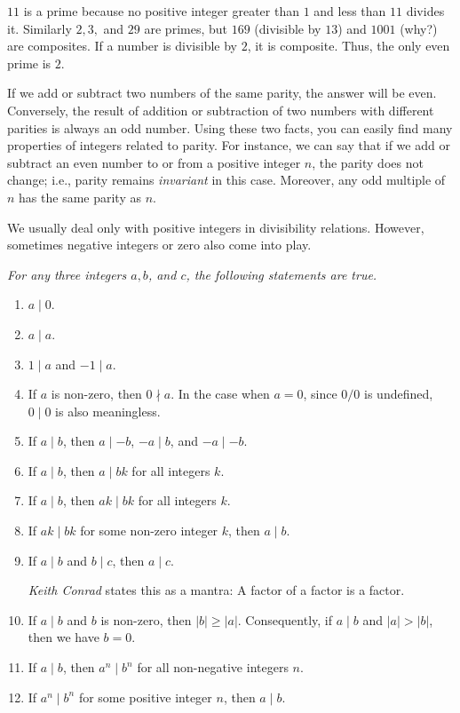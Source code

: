 \documentclass{subfile}
\begin{document}
	\begin{example}
		$11$ is a prime because no positive integer greater than $1$ and less than $11$ divides it. Similarly $2,3,$ and $29$ are primes, but $169$ (divisible by $13$) and $1001$ (why?) are composites. If a number is divisible by $2$, it is composite. Thus, the only even prime is $2$.
	\end{example}

	If we add or subtract two numbers of the same parity, the answer will be even. Conversely, the result of addition or subtraction of two numbers with different parities is always an odd number. Using these two facts, you can easily find many properties of integers related to parity. For instance, we can say that if we add or subtract an even number to or from a positive integer $n$, the parity does not change; i.e., parity remains {\it invariant} in this case. Moreover, any odd multiple of $n$ has the same parity as $n$.

	We usually deal only with positive integers in divisibility relations. However, sometimes negative integers or zero also come into play.

	\begin{proposition}\slshape\label{prop:basicdiv}
		For any three integers $a,b$, and $c$, the following statements are true.
		\begin{enumerate}
			\item $a\mid 0$.
			\item $a\mid a$.
			\item $1\mid a$ and $-1\mid a$.
			\item If $a$ is non-zero, then $0 \nmid a$. In the case when $a=0$, since $0/0$ is undefined,  $0\mid 0$ is also meaningless.
			\item If $a \mid b$, then $a\mid -b$, $-a\mid b$, and $-a\mid -b$.
			\item If $a\mid b$, then $a\mid bk$ for all integers $k$.
			\item If $a\mid b$, then $ak\mid bk$ for all integers $k$.
			\item If $ak\mid bk$ for some non-zero integer $k$, then $a\mid b$.
			\item If $a\mid b$ and $b\mid c$, then $a\mid c$.

			\textit{Keith Conrad} states this as a mantra: A factor of a factor is a factor.
			\item If $a\mid b$ and $b$ is non-zero, then $|b| \geq |a|$. Consequently, if $a\mid b$ and $|a|>|b|$, then we have $b=0$.
			\item If $a\mid b$, then $a^n\mid b^n$ for all non-negative integers $n$.
			\item If $a^n \mid b^n$ for some positive integer $n$, then $a\mid b$.
		\end{enumerate}

	\end{proposition}
\end{document}
